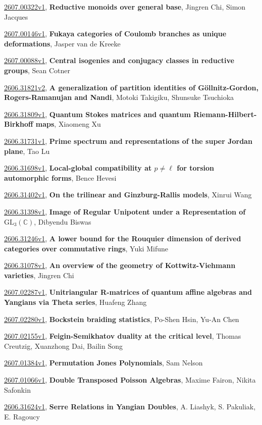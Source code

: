 \documentclass[9pt, a4paper]{article}
\theoremstyle{plain}
\theoremstyle{definition}
\theoremstyle{remark}
\newcommand{\arxiv}[3]{\href{https://arxiv.org/abs/#1}{#1}, \textbf{\textcolor{arxivblue}{#2}}, #3}
\begin{document}
\arxiv{2607.00322v1}{Reductive monoids over general base}{Jingren Chi, Simon Jacques}

\arxiv{2607.00146v1}{Fukaya categories of Coulomb branches as unique deformations}{Jasper van de Kreeke}

\arxiv{2607.00088v1}{Central isogenies and conjugacy classes in reductive groups}{Sean Cotner}

\arxiv{2606.31821v2}{A generalization of partition identities of Göllnitz-Gordon, Rogers-Ramanujan and Nandi}{Motoki Takigiku, Shunsuke Tsuchioka}

\arxiv{2606.31809v1}{Quantum Stokes matrices and quantum Riemann-Hilbert-Birkhoff maps}{Xiaomeng Xu}

\arxiv{2606.31731v1}{Prime spectrum and representations of the super Jordan plane}{Tao Lu}

\arxiv{2606.31698v1}{Local-global compatibility at $p\neq\ell$ for torsion automorphic forms}{Bence Hevesi}

\arxiv{2606.31402v1}{On the trilinear and Ginzburg-Rallis models}{Xinrui Wang}

\arxiv{2606.31398v1}{Image of Regular Unipotent under a Representation of $\mathrm{GL}_3(\mathbb{C})$}{Dibyendu Biswas}

\arxiv{2606.31246v1}{A lower bound for the Rouquier dimension of derived categories over commutative rings}{Yuki Mifune}

\arxiv{2606.31078v1}{An overview of the geometry of Kottwitz-Viehmann varieties}{Jingren Chi}

\arxiv{2607.02287v1}{Unitriangular R-matrices of quantum affine algebras and Yangians via Theta series}{Huafeng Zhang}

\arxiv{2607.02280v1}{Bockstein braiding statistics}{Po-Shen Hsin, Yu-An Chen}

\arxiv{2607.02155v1}{Feigin-Semikhatov duality at the critical level}{Thomas Creutzig, Xuanzhong Dai, Bailin Song}

\arxiv{2607.01384v1}{Permutation Jones Polynomials}{Sam Nelson}

\arxiv{2607.01066v1}{Double Transposed Poisson Algebras}{Maxime Fairon, Nikita Safonkin}

\arxiv{2606.31624v1}{Serre Relations in Yangian Doubles}{A. Liashyk, S. Pakuliak, E. Ragoucy}

\end{document}
